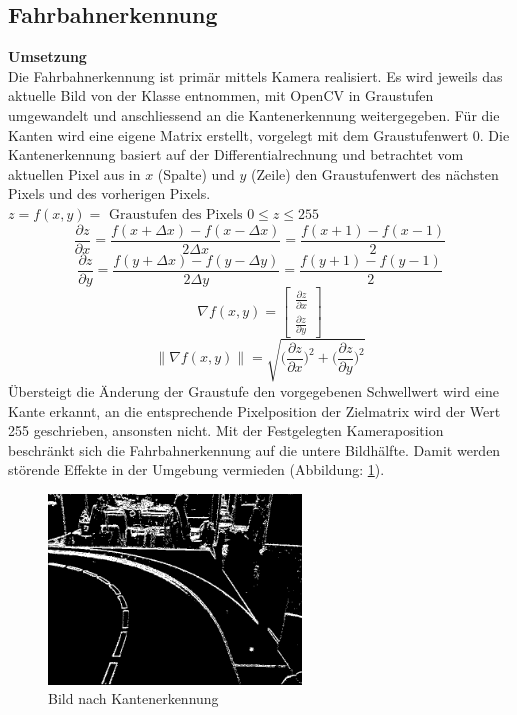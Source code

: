\subsection{Fahrbahnerkennung}
\textbf{Umsetzung}\\[0.2cm]
Die Fahrbahnerkennung ist primär mittels Kamera realisiert. Es wird jeweils das aktuelle Bild von der Klasse  entnommen, mit OpenCV in Graustufen umgewandelt und anschliessend an die Kantenerkennung weitergegeben. Für die Kanten wird eine eigene Matrix erstellt, vorgelegt mit dem Graustufenwert 0. Die Kantenerkennung basiert auf der Differentialrechnung und betrachtet vom aktuellen Pixel aus in $x$ (Spalte) und $y$ (Zeile) den Graustufenwert des nächsten Pixels und des vorherigen Pixels.
$z = f(x,y) = \text{ Graustufen des Pixels }0 \leq z \leq 255$\\
\[
\frac{\partial{z}}{\partial{x}}=\frac{f(x+\Delta{x})-f(x-\Delta{x})}{2\Delta{x}} = \frac{f(x+1)-f(x-1)}{2}
\]
\[
\frac{\partial{z}}{\partial{y}}=\frac{f(y+\Delta{x})-f(y-\Delta{y})}{2\Delta{y}} = \frac{f(y+1)-f(y-1)}{2}
\]
\[
\nabla f(x,y) = \begin{bmatrix}
\frac{\partial{z}}{\partial{x}}\\
\frac{\partial{z}}{\partial{y}}
\end{bmatrix}
\]
\[
\lVert\nabla f(x,y)\rVert = \sqrt{\Biggl(\frac{\partial{z}}{\partial{x}}\Biggr)^2 + \Biggl(\frac{\partial{z}}{\partial{y}}\Biggr)^2}
\]
Übersteigt die Änderung der Graustufe den vorgegebenen Schwellwert wird eine Kante erkannt, an die entsprechende Pixelposition der Zielmatrix wird der Wert 255 geschrieben, ansonsten nicht. Mit der Festgelegten Kameraposition beschränkt sich die Fahrbahnerkennung auf die untere Bildhälfte. Damit werden störende Effekte in der Umgebung vermieden (Abbildung: \ref{fig:edges}). 
\begin{figure}[H]%
\centering
\includegraphics[width=0.6\textwidth]{03_Loesungskonzept/pictures/Kantengrafik.png}
\caption{Bild nach Kantenerkennung}
\label{fig:edges}
\end{figure}
